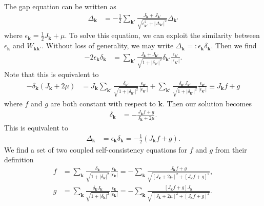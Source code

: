 \documentclass[english, parskip=full]{scrartcl}
\newcommand{\kla}{}
\begin{document}
The gap equation can be written as
\begin{align}
\Delta_{\textbf{k}} &= -\frac{1}{2} \sum_{\textbf{k}'} \frac{J_{\textbf{k}} + J_{\textbf{k}'}}{\sqrt{\epsilon_{\textbf{k}'}^2  + |\Delta_{\textbf{k}'}|^2 }} \Delta_{\textbf{k}'}
\end{align}
where $\epsilon_{\textbf{k}} = \frac{1}{2}J_{\textbf{k}} + \mu$.
To solve this equation, we can exploit the similarity between $\epsilon_{\textbf{k}}$ and $W_{\textbf{k}\textbf{k}'}$.
Without loss of generality, we may write $\Delta_{\textbf{k}} =: \epsilon_{\textbf{k}} \delta_{\textbf{k}}$.
Then we find
\begin{align}
-2\epsilon_{\textbf{k}} \delta_{\textbf{k}} &= \sum_{\textbf{k}'} \frac{J_{\textbf{k}} + J_{\textbf{k}'}}{\sqrt{1 + |\delta_{\textbf{k}'}|^2}} \delta_{\textbf{k}'} \frac{\epsilon_{\textbf{k}'}}{|\epsilon_{\textbf{k}'}|}.
\end{align}
Note that this is equivalent to
\begin{align}
-\delta_{\textbf{k}} \kla\left( J_{\textbf{k}} + 2\mu  \right) &= J_{\textbf{k}} \sum_{\textbf{k}'} \frac{\delta_{\textbf{k}'}}{\sqrt{1 + |\delta_{\textbf{k}'}|^2}} \frac{\epsilon_{\textbf{k}'}}{|\epsilon_{\textbf{k}'}|} + \sum_{\textbf{k}'} \frac{\delta_{\textbf{k}'} J_{\textbf{k}'}}{\sqrt{1 + |\delta_{\textbf{k}'}|^2}}  \frac{\epsilon_{\textbf{k}'}}{|\epsilon_{\textbf{k}'}|} \equiv J_{\textbf{k}} f + g
\end{align}
where $f$ and $g$ are both constant with respect to $\textbf{k}$.
Then our solution becomes
\begin{align}
\delta_{\textbf{k}} &= -\frac{J_{\textbf{k}}f + g}{J_{\textbf{k}} + 2\mu}.
\end{align}
This is equivalent to 
\begin{align}
\Delta_{\textbf{k}} &= \epsilon_{\textbf{k}} \delta_{\textbf{k}} = -\frac{1}{2} \left( J_{\textbf{k}} f+g\right).
\end{align}
We find a set of two coupled self-consistency equations for $f$ and $g$ from their definition
\begin{align}
f &= \sum_{\textbf{k}} \frac{\delta_{\textbf{k}}}{\sqrt{1 + |\delta_{\textbf{k}}|^2}}  \frac{\epsilon_{\textbf{k}}}{|\epsilon_{\textbf{k}}|} = - \sum_{\textbf{k}} \frac{J_{\textbf{k}}f + g}{\sqrt{\left[ J_{\textbf{k}}+2\mu\right]^2 + \left[ J_{\textbf{k}}f + g \right]^2}},\\
g &= \sum_{\textbf{k}} \frac{\delta_{\textbf{k}} J_{\textbf{k}}}{\sqrt{1 + |\delta_{\textbf{k}}|^2}} \frac{\epsilon_{\textbf{k}}}{|\epsilon_{\textbf{k}}|} = - \sum_{\textbf{k}} \frac{\left[ J_{\textbf{k}}f + g \right] J_{\textbf{k}}}{\sqrt{\left[ J_{\textbf{k}} + 2\mu \right]^2 + \left[ J_{\textbf{k}}f + g\right]^2}}.
\end{align}
\end{document}
